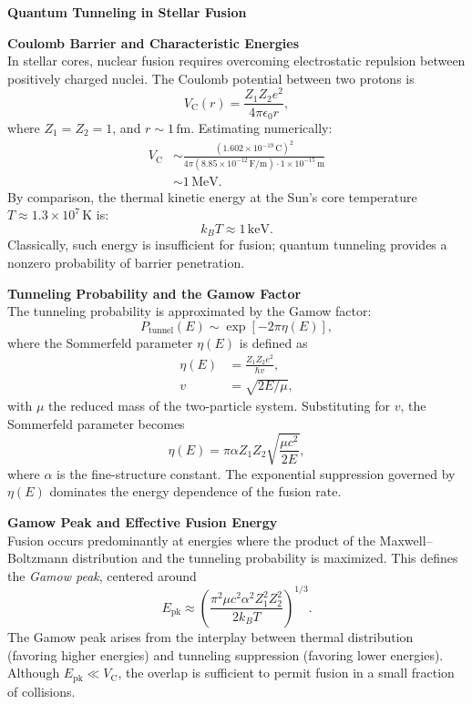 \begin{technical}
    {\Large\textbf{Quantum Tunneling in Stellar Fusion}}
    
    \textbf{Coulomb Barrier and Characteristic Energies}\\[0.5em]
    In stellar cores, nuclear fusion requires overcoming electrostatic repulsion between positively charged nuclei. The Coulomb potential between two protons is
    \[
    V_\text{C}(r) = \frac{Z_1 Z_2 e^2}{4\pi \epsilon_0 r},
    \]
    where \( Z_1 = Z_2 = 1 \), and \( r \sim 1\,\text{fm} \). Estimating numerically:
    \begin{align*}
    V_\text{C} &\sim \frac{(1.602 \times 10^{-19}\,\text{C})^2}{4\pi (8.85 \times 10^{-12}\,\text{F/m}) \cdot 1 \times 10^{-15}\,\text{m}}\\
               &\sim 1\,\text{MeV}.
    \end{align*}
    By comparison, the thermal kinetic energy at the Sun’s core temperature \( T \approx 1.3 \times 10^7\,\text{K} \) is:
    \[
    k_B T \approx 1\,\text{keV}.
    \]
    Classically, such energy is insufficient for fusion; quantum tunneling provides a nonzero probability of barrier penetration.
    
    \vspace{0.7em}
    \textbf{Tunneling Probability and the Gamow Factor}\\[0.5em]
    The tunneling probability is approximated by the Gamow factor:
    \[
    P_\text{tunnel}(E) \sim \exp\left[-2\pi \eta(E)\right],
    \]
    where the Sommerfeld parameter \(\eta(E)\) is defined as
    \begin{align*}
    \eta(E) &= \frac{Z_1 Z_2 e^2}{\hbar v}, \\
    v &= \sqrt{2E/\mu},
    \end{align*}
    with \(\mu\) the reduced mass of the two-particle system. Substituting for \(v\), the Sommerfeld parameter becomes
    \[
    \eta(E) = \pi \alpha Z_1 Z_2 \sqrt{\frac{\mu c^2}{2E}},
    \]
    where \(\alpha\) is the fine-structure constant. The exponential suppression governed by \(\eta(E)\) dominates the energy dependence of the fusion rate.
    
    \vspace{0.7em}
    \textbf{Gamow Peak and Effective Fusion Energy}\\[0.5em]
    Fusion occurs predominantly at energies where the product of the Maxwell–Boltzmann distribution and the tunneling probability is maximized. This defines the \emph{Gamow peak}, centered around
    \[
    E_\text{pk} \approx \left( \frac{\pi^2 \mu c^2 \alpha^2 Z_1^2 Z_2^2}{2 k_B T} \right)^{1/3}.
    \]
    The Gamow peak arises from the interplay between thermal distribution (favoring higher energies) and tunneling suppression (favoring lower energies). Although \( E_\text{pk} \ll V_\text{C} \), the overlap is sufficient to permit fusion in a small fraction of collisions.
    

\end{technical}
